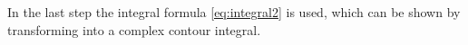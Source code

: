 %
In the last step the integral formula \ref{eq:integral2} is used, which can be shown by transforming into a complex contour integral.


















%
%



